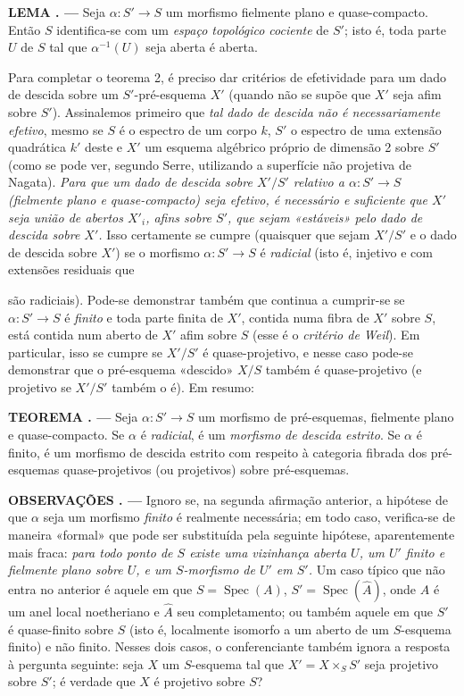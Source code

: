 \documentclass[11pt,twoside,openany]{book}
\numberwithin{equation}{section}
\newcommand{\src}[1]{%
  \phantomsection\hypertarget{src:#1}{}%
  \marginpar{\raggedleft\footnotesize\sffamily #1}%
}
\theoremstyle{plain}
\theoremstyle{definition}
\theoremstyle{remark}
\newcommand{\result}[2]{%
  \par\medskip\noindent\textbf{#1%
  \if\relax\detokenize{#2}\relax\else\space#2\fi. ---}\enspace
}
\newcommand{\FgaUnitKey}{frontmatter}
\renewcommand{\src}[1]{%
  \phantomsection\hypertarget{src:\FgaUnitKey:#1}{}%
  \marginpar{\raggedleft\footnotesize\sffamily #1}%
}
\begin{document}
\result{LEMA}{1.2} Seja $\alpha:S'\longrightarrow S$ um morfismo fielmente plano
e quase-compacto. Então $S$ identifica-se com um \emph{espaço topológico
cociente} de $S'$; isto é, toda parte $U$ de $S$ tal que
$\alpha^{-1}(U)$ seja aberta é aberta.

Para completar o teorema 2, é preciso dar critérios de efetividade para um dado
de descida sobre um $S'$-pré-esquema $X'$ (quando não se supõe que $X'$ seja
afim sobre $S'$). Assinalemos primeiro que \emph{tal dado de descida não é
necessariamente efetivo}, mesmo se $S$ é o espectro de um corpo $k$, $S'$
o espectro de uma extensão quadrática $k'$ deste e $X'$ um esquema
algébrico próprio de dimensão 2 sobre $S'$ (como se pode ver, segundo Serre,
utilizando a superfície não projetiva de Nagata). \emph{Para que um dado de
descida sobre $X'/S'$ relativo a $\alpha:S'\longrightarrow S$ (fielmente
plano e quase-compacto) seja efetivo, é necessário e suficiente que $X'$ seja
união de abertos $X'_i$, afins sobre $S'$, que sejam «estáveis» pelo dado de
descida sobre $X'$.} Isso certamente se cumpre (quaisquer que sejam $X'/S'$
e o dado de descida sobre $X'$) se o morfismo
$\alpha:S'\longrightarrow S$ é \emph{radicial} (isto é, injetivo e com
extensões residuais que

\src{318}
são radiciais). Pode-se demonstrar também que continua a cumprir-se se
$\alpha:S'\longrightarrow S$ é \emph{finito} e toda parte finita de $X'$,
contida numa fibra de $X'$ sobre $S$, está contida num aberto de $X'$
afim sobre $S$ (esse é o \emph{critério de Weil}). Em particular, isso se
cumpre se $X'/S'$ é quase-projetivo, e nesse caso pode-se demonstrar que o
pré-esquema «descido» $X/S$ também é quase-projetivo (e projetivo se
$X'/S'$ também o é). Em resumo:

\result{TEOREMA}{3} Seja $\alpha:S'\longrightarrow S$ um morfismo de
pré-esquemas, fielmente plano e quase-compacto. Se $\alpha$ é \emph{radicial},
é um \emph{morfismo de descida estrito}. Se $\alpha$ é finito, é um
morfismo de descida estrito com respeito à categoria fibrada dos
pré-esquemas quase-projetivos (ou projetivos) sobre pré-esquemas.

\result{OBSERVAÇÕES}{} Ignoro se, na segunda afirmação anterior, a
hipótese de que $\alpha$ seja um morfismo \emph{finito} é realmente necessária;
em todo caso, verifica-se de maneira «formal» que pode ser substituída pela
seguinte hipótese, aparentemente mais fraca: \emph{para todo ponto de $S$
existe uma vizinhança aberta $U$, um $U'$ finito e fielmente plano sobre $U$, e um
$S$-morfismo de $U'$ em $S'$.} Um caso típico que não entra no anterior é
aquele em que $S=\operatorname{Spec}(A)$,
$S'=\operatorname{Spec}(\widehat A)$, onde $A$ é um anel local noetheriano
e $\widehat A$ seu completamento; ou também aquele em que $S'$ é quase-finito sobre
$S$ (isto é, localmente isomorfo a um aberto de um $S$-esquema finito) e não
finito. Nesses dois casos, o conferenciante também ignora a resposta à
pergunta seguinte: seja $X$ um $S$-esquema tal que $X'=X\times_SS'$ seja
projetivo sobre $S'$; é verdade que $X$ é projetivo sobre $S$?
\end{document}
